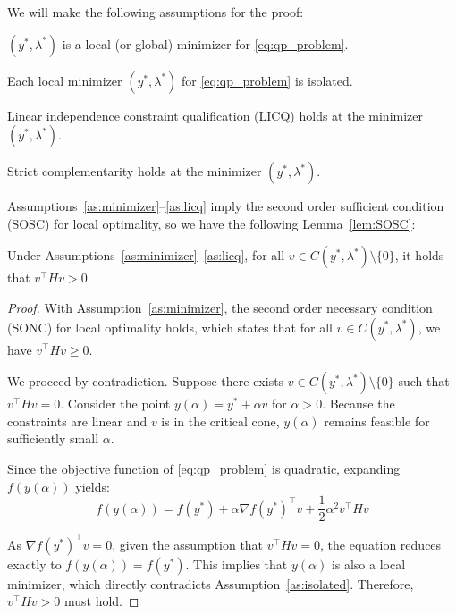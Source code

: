 \documentclass[class=scrbook, crop=false]{standalone}
\begin{document}
We will make the following assumptions for the proof:
\begin{assumption}
    \label{as:minimizer}
    $(y^*, \lambda^*)$ is a local (or global) minimizer for \eqref{eq:qp_problem}.
\end{assumption}

\begin{assumption}
    \label{as:isolated}
    Each local minimizer $(y^*,\lambda^*)$ for \eqref{eq:qp_problem} is isolated.
\end{assumption}

\begin{assumption}
    \label{as:licq}
    Linear independence constraint qualification (LICQ) holds at the minimizer $(y^*, \lambda^*)$.
\end{assumption}

\begin{assumption}
    \label{as:strict_comp}
    Strict complementarity holds at the minimizer $(y^*, \lambda^*)$.
\end{assumption}

Assumptions~\ref{as:minimizer}--\ref{as:licq} imply the second order sufficient condition (SOSC) for local optimality,
so we have the following Lemma~\ref{lem:SOSC}:
\begin{lemma}
    \label{lem:SOSC}
    Under Assumptions~\ref{as:minimizer}--\ref{as:licq}, for all $v \in C(y^*,\lambda^*) \setminus \{0\}$, it holds that $v^\top H v > 0$.
\end{lemma}

\begin{proof}
    With Assumption~\ref{as:minimizer}, the second order necessary condition (SONC) for local optimality holds, which states that for all $v \in C(y^*,\lambda^*)$, we have $v^\top H v \ge 0$.

    We proceed by contradiction. Suppose there exists $v \in C(y^*,\lambda^*) \setminus \{0\}$ such that $v^\top H v = 0$. 
    Consider the point $y(\alpha) = y^* + \alpha v$ for $\alpha > 0$. Because the constraints are linear and $v$ is in the critical cone, $y(\alpha)$ remains feasible for sufficiently small $\alpha$. 

    Since the objective function of \eqref{eq:qp_problem} is quadratic, expanding $f(y(\alpha))$ yields:
    \begin{equation*}
        f(y(\alpha)) = f(y^*) + \alpha \nabla f(y^*)^\top v + \frac{1}{2} \alpha^2 v^\top H v
    \end{equation*}

    As $\nabla f(y^*)^\top v = 0$, given the assumption that $v^\top H v = 0$, the equation reduces exactly to $f(y(\alpha)) = f(y^*)$. 
    This implies that $y(\alpha)$ is also a local minimizer, which directly contradicts Assumption~\ref{as:isolated}. Therefore, $v^\top H v > 0$ must hold.
\end{proof}
\end{document}
